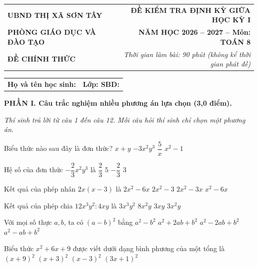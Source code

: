 \documentclass[11pt,a4paper]{article}
\begin{document}
\noindent
\begin{tabularx}{\linewidth}{X r}
\textbf{UBND THỊ XÃ SƠN TÂY} & \textbf{ĐỀ KIỂM TRA ĐỊNH KỲ GIỮA HỌC KỲ I} \\
\textbf{PHÒNG GIÁO DỤC VÀ ĐÀO TẠO} & \textbf{NĂM HỌC 2026 -- 2027 -- Môn: TOÁN 8} \\
\textbf{ĐỀ CHÍNH THỨC} & \textit{Thời gian làm bài: 90 phút (không kể thời gian phát đề)} \\
\hline
\end{tabularx}
\vspace{0.8mm}
\noindent
\begin{tabularx}{\linewidth}{X r}
\textbf{Họ và tên học sinh: \dotfill} & \textbf{Lớp: \dotfill \quad SBD: \dotfill} \\
\end{tabularx}
\vspace{1.2mm}

\noindent\textbf{\large PHẦN I. Câu trắc nghiệm nhiều phương án lựa chọn (3,0 điểm).}

\textit{Thí sinh trả lời từ câu 1 đến câu 12. Mỗi câu hỏi thí sinh chỉ chọn một phương án.}

\begin{ex}
Biểu thức nào sau đây là đơn thức?
\choice
{$x + y$}
{\True $-3x^2y^3$}
{$\dfrac{5}{x}$}
{$x^2 - 1$}
\end{ex}

\begin{ex}
Hệ số của đơn thức $-\dfrac{2}{3}x^2y^3$ là
\choice
{$\dfrac{2}{3}$}
{$5$}
{\True $-\dfrac{2}{3}$}
{$3$}
\end{ex}

\begin{ex}
Kết quả của phép nhân $2x(x - 3)$ là
\choice
{\True $2x^2 - 6x$}
{$2x^2 - 3$}
{$2x^2 - 3x$}
{$x^2 - 6x$}
\end{ex}

\begin{ex}
Kết quả của phép chia $12x^3y^2 : 4xy$ là
\choice
{$3x^3y^2$}
{$8x^2y$}
{$3xy$}
{\True $3x^2y$}
\end{ex}

\begin{ex}
Với mọi số thực $a, b$, ta có $(a - b)^2$ bằng
\choice
{$a^2 - b^2$}
{$a^2 + 2ab + b^2$}
{\True $a^2 - 2ab + b^2$}
{$a^2 - ab + b^2$}
\end{ex}

\begin{ex}
Biểu thức $x^2 + 6x + 9$ được viết dưới dạng bình phương của một tổng là
\choice
{$(x + 9)^2$}
{\True $(x + 3)^2$}
{$(x - 3)^2$}
{$(3x + 1)^2$}
\end{ex}
\end{document}

